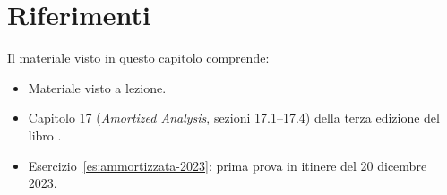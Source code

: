 \section*{Riferimenti}
Il materiale visto in questo capitolo comprende:
\begin{itemize}
    \item Materiale visto a lezione.
    \item Capitolo 17 (\emph{Amortized Analysis}, sezioni 17.1--17.4) della terza edizione del libro  \cite{Cormen-et-al-2009}.
    \item Esercizio~\ref{es:ammortizzata-2023}: prima prova in itinere del 20 dicembre 2023.
\end{itemize}
